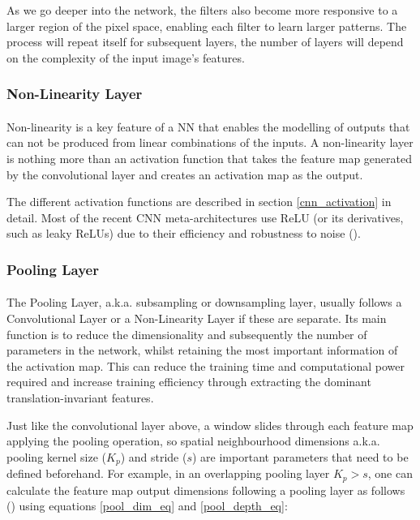 As we go deeper into the network, the filters also become more responsive to a larger region of the pixel space, enabling each filter to learn larger patterns. The process will repeat itself for subsequent layers, the number of layers will depend on the complexity of the input image's features.

\subsubsection{Non-Linearity Layer}
\paragraph{}
Non-linearity is a key feature of a \gls{NN} that enables the modelling of outputs that can not be produced from linear combinations of the inputs. A non-linearity layer is nothing more than an activation function that takes the feature map generated by the convolutional layer and creates an activation map as the output. 

The different activation functions are described in section \ref{cnn_activation} in detail. Most of the recent \gls{CNN} meta-architectures use \gls{ReLU} (or its derivatives, such as leaky \gls{ReLU}s) due to their efficiency and robustness to noise (\cite{He_2015_ICCV}).

\subsubsection{Pooling Layer}
\paragraph{}
The Pooling Layer, \gls{a.k.a.} subsampling or downsampling layer, usually follows a Convolutional Layer or a Non-Linearity Layer if these are separate. 
Its main function is to reduce the dimensionality and subsequently the number of parameters in the network, whilst retaining the most important information of the activation map. This can reduce the training time and computational power required and increase training efficiency through extracting the dominant translation-invariant features.

Just like the convolutional layer above, a window slides through each feature map applying the pooling operation, so spatial neighbourhood dimensions \gls{a.k.a.} pooling kernel size ($K_p$) and stride ($s$) are important parameters that need to be defined beforehand. For example, in an overlapping pooling layer $K_p > s$, one can calculate the feature map output dimensions following a pooling layer as follows (\cite{dumoulin2018guide}) using equations \ref{pool_dim_eq} and \ref{pool_depth_eq}:


